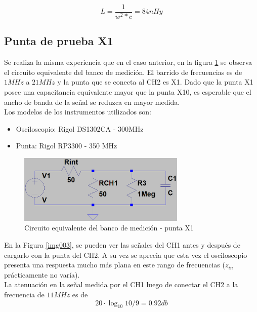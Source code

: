\documentclass[a4paper,10pt]{article}
\begin{document}
		\begin{equation*}
			 L = \frac{1}{w^2*c} = 84 nHy 
		\end{equation*}

									
		\subsection{Punta de prueba X1}
		\indent Se realiza la misma experiencia que en el caso anterior, en la
		figura \ref{esq002} se observa el circuito equivalente del banco de 
		medición. El barrido de frecuencias es de $1MHz$ a $21MHz$ y la punta
		que se conecta al CH2 es X1. Dado que la punta X1 posee una 
		capacitancia equivalente mayor que la punta X10, es esperable que el 
		ancho de banda de la se\~nal se reduzca en mayor medida. \\

		\indent Los modelos de los instrumentos utilizados son:
		
		\begin{itemize}
			\item Osciloscopio: Rigol DS1302CA - 300MHz
			\item Punta: Rigol RP3300 - 350 MHz
		\end{itemize}

		\begin{figure}[!htb]
			\centering
			\includegraphics[width=8cm]
			{Esquematicos/EsqFrecCortePuntaX1.png}
			\caption{Circuito equivalente del banco de medición - punta X1} 
			\label{esq002}
		\end{figure}

		\indent En la Figura \ref{img003}, se pueden ver las se\~nales del CH1
		antes y despu\'es de cargarlo con la punta del CH2. A su vez se 
		aprecia que esta vez el osciloscopio presenta una respuesta mucho más
		plana en este rango de frecuencias ($z_{in}$ prácticamente no varía). \\
		\indent La atenuación en la señal medida por el CH1 luego de conectar
		el CH2 a la frecuencia de $11 MHz$ es de 
		$$ 20\cdot \log_{10}10/9 = 0.92db $$
		
\end{document}
